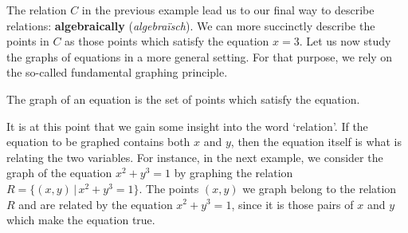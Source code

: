 The relation $C$ in the previous example lead us to our final way to describe relations: \textbf{algebraically} (\textit{algebra\"isch}). We can more succinctly describe the points in $C$ as those points which satisfy the equation $x = 3$.  Let us now study the graphs of equations in a more general setting. For that purpose, we rely on the so-called fundamental graphing principle.


\begin{definition}
The graph of an equation is the set of points which satisfy the equation.  %
\end{definition}

It is at this point that we gain some insight into the word `relation'.  If the equation to be graphed contains both $x$ and $y$, then the equation itself is what is relating the two variables.  For instance, in the next example, we consider the  graph of the equation $x^2+y^3=1$ by graphing the relation $R = \{ (x,y) \, | \, x^2+y^3 = 1\}$.  \ifvc The points $(x,y)$ we graph belong to the relation $R$ and are related by the equation  $x^2+y^3 = 1$, since it is those pairs of $x$ and $y$ which make the equation true.\fi

